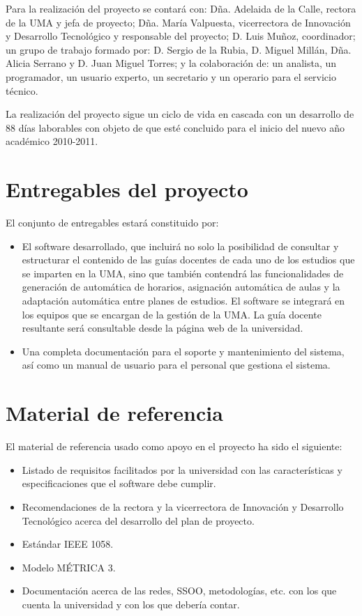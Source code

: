 \documentclass[11pt,a4paper,spanish,twoside]{report}
\begin{document}
Para la realización del proyecto se contará con: Dña. Adelaida de la Calle, 
rectora de la UMA y jefa de proyecto; Dña. María Valpuesta, vicerrectora de 
Innovación y Desarrollo Tecnológico y responsable del proyecto; D. Luis 
Muñoz, coordinador; un grupo de trabajo formado por: D. Sergio de la Rubia, 
D. Miguel Millán, Dña. Alicia Serrano y D. Juan Miguel Torres; y la 
colaboración de: un analista, un programador, un usuario experto, un 
secretario y un operario para el servicio técnico.

La realización del proyecto sigue un ciclo de vida en cascada con un 
desarrollo de 88 días laborables con objeto de que esté concluido para el 
inicio del nuevo año académico 2010-2011.

\section{Entregables del proyecto}
El conjunto de entregables estará constituido por:
\begin{itemize}
\item El software desarrollado, que incluirá no solo la posibilidad de
  consultar y estructurar el contenido de las guías docentes de cada uno de
  los estudios que se imparten en la UMA, sino que también contendrá las
  funcionalidades de generación de automática de horarios, asignación
  automática de aulas y la adaptación automática entre planes de estudios. El
  software se integrará en los equipos que se encargan de la gestión de la
  UMA. La guía docente resultante será consultable desde la página web de la
  universidad.
\item Una completa documentación para el soporte y mantenimiento del sistema,
  así como un manual de usuario para el personal que gestiona el sistema. 
\end{itemize}

\section{Material de referencia}
El material de referencia usado como apoyo en el proyecto ha sido el siguiente:
\begin{itemize}
\item Listado de requisitos facilitados por la universidad con las 
  características y especificaciones que el software debe cumplir.
\item Recomendaciones de la rectora y la vicerrectora de Innovación y 
  Desarrollo Tecnológico acerca del desarrollo del plan de proyecto.
\item Estándar IEEE 1058\cite{ieee}.
\item Modelo MÉTRICA 3\cite{met}.
\item Documentación acerca de las redes, SSOO, metodologías, etc. con los que 
  cuenta la universidad y con los que debería contar.
\end{itemize}
\end{document}
